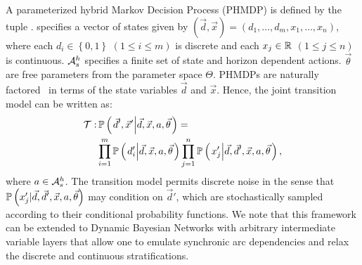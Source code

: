 \documentclass[letterpaper]{article}
\begin{document}
A parameterized hybrid Markov Decision Process (PHMDP) is defined by the tuple {\footnotesize \PMDPTuple}. {\footnotesize \State} specifies a vector of states given by {\footnotesize $(\vec{d}, \vec{x}) =  \left( d_1, \ldots, d_m, x_1, \ldots, x_n \right) $}, where each {\footnotesize $ d_i \in \left\lbrace 0, 1 \right\rbrace $} {\footnotesize $\left( 1 \leq i \leq m \right)$} is discrete and each {\footnotesize$ x_j \in \mathbb{R} $} {\footnotesize $\left( 1 \leq j \leq   n \right)$} is continuous. {\footnotesize $\mathcal{A}^{h}_{s}$} specifies a finite set of state and horizon dependent actions.  {\footnotesize $\vec{\theta} $} are free parameters from the parameter space {\footnotesize $ \Theta $}. PHMDPs are naturally factored~\cite{Boutilier_JAIR_1999} in terms of the state variables {\footnotesize$\vec{d}$} and {\footnotesize $\vec{x}$}. Hence, the joint transition model can be written as:
{\footnotesize
    \begin{align}
    \label{eq:hmdp_tfunc}
    \mathcal{T} :& \, \mathbb{P}\left({ \left. \vec{d}', \vec{x}' \middle| \vec{d}, \vec{x}, a, \vec{\theta} \right.}\right) = \nonumber \\
    & \prod_{i=1}^{m} \mathbb{P}\left({ \left. d_i' \middle| \vec{d}, \vec{x}, a, \vec{\theta} \right. }\right) \prod_{j=1}^{n} \mathbb{P}\left({ \left. x_j' \middle| \vec{d}, \vec{d}', \vec{x}, a, \vec{\theta} \right. }\right),
    \end{align}   
}
where {\footnotesize $ a \in \mathcal{A}^{h}_{s} $}. The transition model permits discrete noise in the sense that {\footnotesize $ \mathbb{P}\left({ x_j' | \vec{d}, \vec{d}', \vec{x}, a, \vec{\theta} }\right) $} may condition on $ \vec{d}' $, which are stochastically sampled according to their conditional probability functions. We note that this framework can be extended to Dynamic Bayesian Networks with arbitrary intermediate variable layers that allow one to emulate synchronic arc dependencies and relax the discrete and continuous stratifications.
\end{document}
